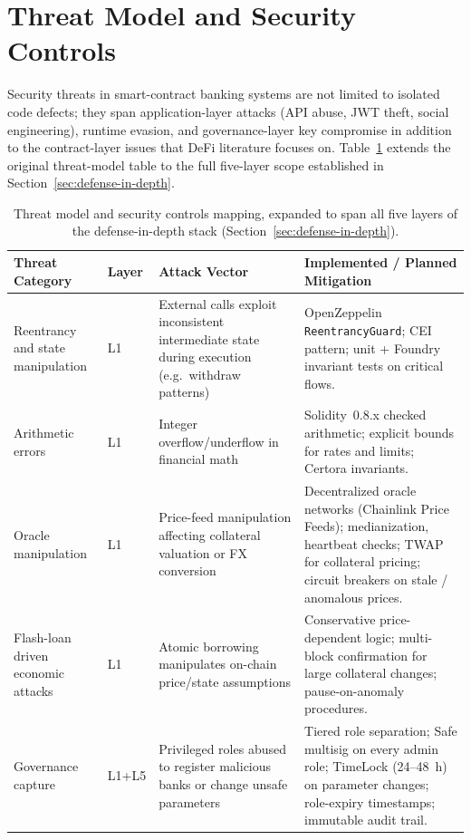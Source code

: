 \documentclass[12pt,a4paper]{report}
\begin{document}
\section{Threat Model and Security Controls}
\label{sec:threat-model}

Security threats in smart-contract banking systems are not limited to isolated code defects; they span application-layer attacks (API abuse, JWT theft, social engineering), runtime evasion, and governance-layer key compromise in addition to the contract-layer issues that DeFi literature focuses on. Table~\ref{tab:threat-model} extends the original threat-model table to the full five-layer scope established in Section~\ref{sec:defense-in-depth}.

\begin{table}[H]
\centering
\caption{Threat model and security controls mapping, expanded to span all five layers of the defense-in-depth stack (Section~\ref{sec:defense-in-depth}).}
\label{tab:threat-model}
\begin{tabular}{p{2.6cm}p{2.0cm}p{4.5cm}p{4.8cm}}
\hline
\textbf{Threat Category} & \textbf{Layer} & \textbf{Attack Vector} & \textbf{Implemented / Planned Mitigation} \\
\hline
Reentrancy and state manipulation & L1 & External calls exploit inconsistent intermediate state during execution (e.g.\ withdraw patterns) & OpenZeppelin \texttt{ReentrancyGuard}; CEI pattern; unit + Foundry invariant tests on critical flows. \\
\hline
Arithmetic errors & L1 & Integer overflow/underflow in financial math & Solidity~0.8.x checked arithmetic; explicit bounds for rates and limits; Certora invariants. \\
\hline
Oracle manipulation & L1 & Price-feed manipulation affecting collateral valuation or FX conversion & Decentralized oracle networks (Chainlink Price Feeds); medianization, heartbeat checks; TWAP for collateral pricing; circuit breakers on stale / anomalous prices. \\
\hline
Flash-loan driven economic attacks & L1 & Atomic borrowing manipulates on-chain price/state assumptions & Conservative price-dependent logic; multi-block confirmation for large collateral changes; pause-on-anomaly procedures. \\
\hline
Governance capture & L1+L5 & Privileged roles abused to register malicious banks or change unsafe parameters & Tiered role separation; Safe multisig on every admin role; TimeLock (24--48~h) on parameter changes; role-expiry timestamps; immutable audit trail. \\

\end{tabular}
\end{table}
\end{document}
